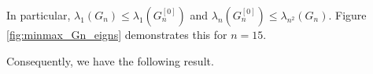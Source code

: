 \documentclass{article}
\newtheorem{theorem}{Theorem}[section]
\newcommand{\cT}{\mathcal{T}}
\begin{document}
    
           In particular,  $\lambda_1(G_n) \leq \lambda_1(G_n^{[0]})$ and $\lambda_n(G_n^{[0]}) \leq  \lambda_{n^2}(G_n)$. Figure \ref{fig:minmax_Gn_eigns} demonstrates this for $n=15$.




Consequently, we have the following result.



    

    

\end{document}
